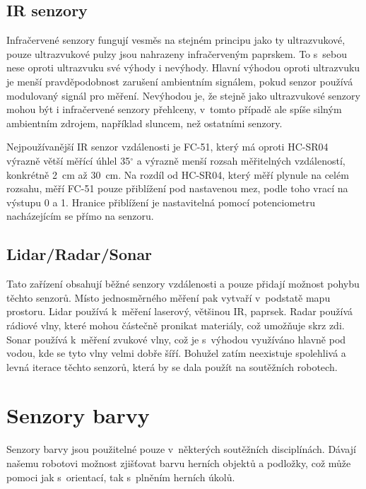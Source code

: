 \subsection{IR senzory}
Infračervené senzory fungují vesměs na stejném principu jako ty ultrazvukové, pouze ultrazvukové pulzy jsou nahrazeny infračerveným paprskem.
To s~sebou nese oproti ultrazvuku své výhody i nevýhody.
Hlavní výhodou oproti ultrazvuku je menší pravděpodobnost zarušení ambientním signálem, pokud senzor používá modulovaný signál pro měření. 
Nevýhodou je, že stejně jako ultrazvukové senzory mohou být i infračervené senzory přehlceny, v~tomto případě ale spíše silným ambientním zdrojem, například sluncem, než ostatními senzory.

Nejpoužívanější IR senzor vzdálenosti je FC-51\cite{fc-51}, který má oproti HC-SR04 výrazně větší měřící úhlel 35$^{\circ}$ a výrazně menší rozsah měřitelných vzdáleností, konkrétně 2~cm až 30~cm.
Na rozdíl od HC-SR04, který měří plynule na celém rozsahu, měří FC-51 pouze přiblížení pod nastavenou mez, podle toho vrací na výstupu 0 a 1.
Hranice přiblížení je nastavitelná pomocí potenciometru nacházejícím se přímo na senzoru.


\subsection{Lidar/Radar/Sonar}
Tato zařízení obsahují běžné senzory vzdálenosti a pouze přidají možnost pohybu těchto senzorů. 
Místo jednosměrného měření pak vytvaří v~podstatě mapu prostoru.
Lidar používá k~měření laserový, většinou IR, paprsek.
Radar používá rádiové vlny, které mohou částečně pronikat materiály, což umožňuje  skrz zdi.
Sonar používá k~měření zvukové vlny, což je s~výhodou využíváno hlavně pod vodou, kde se tyto vlny velmi dobře šíří.
Bohužel zatím neexistuje spolehlivá a levná iterace těchto senzorů, která by se dala použít na soutěžních robotech.

\section{Senzory barvy}
Senzory barvy jsou použitelné pouze v~některých soutěžních disciplínách.
Dávají našemu robotovi možnost zjišťovat barvu herních objektů a podložky, což může pomoci jak s~orientací, tak s~plněním herních úkolů.

